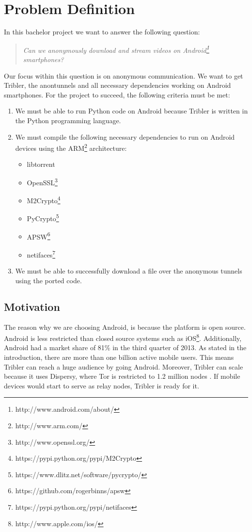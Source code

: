 \chapter{Problem Definition}
\label{cpt:problemdefinition}

In this bachelor project we want to answer the following question:

\begin{quote}
\emph{Can we anonymously download and stream videos on Android\footnote{http://www.android.com/about/} smartphones?}
\end{quote}

Our focus within this question is on anonymous communication. We want to get Tribler, the anontunnels and all necessary dependencies working on Android smartphones. For the project to succeed, the following criteria must be met:
\begin{enumerate}
\item We must be able to run Python code on Android because Tribler is written in the Python programming language.
\item We must compile the following necessary dependencies to run on Android devices using the ARM\footnote{http://www.arm.com/} architecture:
\begin{itemize}
\item libtorrent
\item OpenSSL\footnote{http://www.openssl.org/}
\item M2Crypto\footnote{https://pypi.python.org/pypi/M2Crypto}
\item PyCrypto\footnote{https://www.dlitz.net/software/pycrypto/}
\item APSW\footnote{https://github.com/rogerbinns/apsw}
\item netifaces\footnote{https://pypi.python.org/pypi/netifaces}
\end{itemize}
\item We must be able to successfully download a file over the anonymous tunnels using the ported code.
\end{enumerate}

	\section{Motivation}
	\label{sec:motivation}
		The reason why we are choosing Android, is because the platform is open source. Android is less restricted than closed source systems such as iOS\footnote{http://www.apple.com/ios/}. Additionally, Android had a market share of 81\% in the third quarter of 2013\cite{forbesandroidmarket}. As stated in the introduction, there are more than one billion active mobile users. This means Tribler can reach a huge audience by going Android. Moreover, Tribler can scale because it uses Dispersy, where Tor is restricted to 1.2 million nodes \cite{mclachlan2009scalable}. If mobile devices would start to serve as relay nodes, Tribler is ready for it.
		
